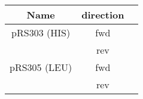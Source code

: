 \begin{tabular}{ccL{6cm}}
\toprule
  Name
  & direction
  &  \\
\midrule
  pRS303 (HIS)
    & fwd
      &  \\
    & rev
      &   \\
  pRS305 (LEU)
    & fwd
      &  \\
    & rev
      &  \\
\bottomrule
\end{tabular}
